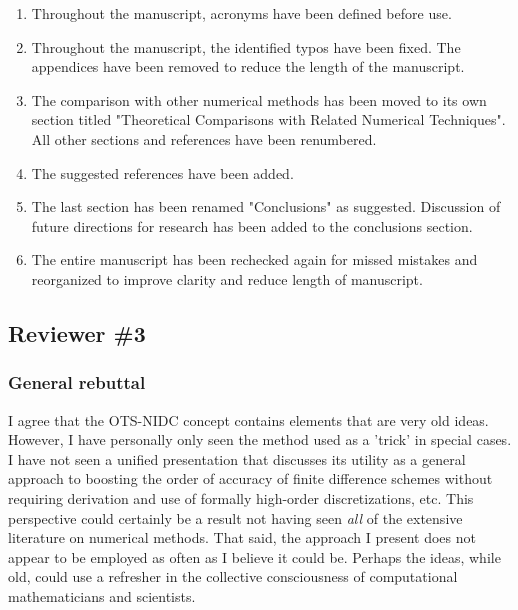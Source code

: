 \documentclass[12pt]{article}
\begin{document}
\begin{enumerate}
\item Throughout the manuscript, acronyms have been defined before use.

\item Throughout the manuscript, the identified typos have been fixed.  The
      appendices have been removed to reduce the length of the manuscript.

\item The comparison with other numerical methods has been moved to its own 
      section titled "Theoretical Comparisons with Related Numerical
      Techniques".  All other sections and references have been renumbered.

\item The suggested references have been added.

\item The last section has been renamed "Conclusions" as suggested.
      Discussion of future directions for research has been added to the 
      conclusions section.
   
\item The entire manuscript has been rechecked again for missed mistakes and
      reorganized to improve clarity and reduce length of manuscript.

\end{enumerate}


\subsection*{Reviewer \#3}

\subsubsection*{General rebuttal}

I agree that the OTS-NIDC concept contains elements that are very old ideas. 
However, I have personally only seen the method used as a 'trick' in special
cases.  I have not seen a unified presentation that discusses its utility as
a general approach to boosting the order of accuracy of finite difference
schemes without requiring derivation and use of formally high-order
discretizations, etc.  This perspective could certainly be a result not having
seen \emph{all} of the extensive literature on numerical methods.  That said,
the approach I present does not appear to be employed as often as I believe it
could be.  Perhaps the ideas, while old, could use a refresher in the
collective consciousness of computational mathematicians and scientists.
\end{document}

